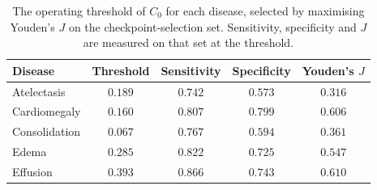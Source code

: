 \begin{table}[htbp]
\centering
\small
\caption{The operating threshold of $C_0$ for each disease, selected by maximising Youden's $J$ on the checkpoint-selection set. Sensitivity, specificity and $J$ are measured on that set at the threshold.}
\label{tab:c0_thresholds}
\begin{tabular}{lcccc}
\toprule
Disease & Threshold & Sensitivity & Specificity & Youden's $J$ \\
\midrule
Atelectasis & $0.189$ & $0.742$ & $0.573$ & $0.316$ \\
Cardiomegaly & $0.160$ & $0.807$ & $0.799$ & $0.606$ \\
Consolidation & $0.067$ & $0.767$ & $0.594$ & $0.361$ \\
Edema & $0.285$ & $0.822$ & $0.725$ & $0.547$ \\
Effusion & $0.393$ & $0.866$ & $0.743$ & $0.610$ \\
\bottomrule
\end{tabular}
\end{table}

